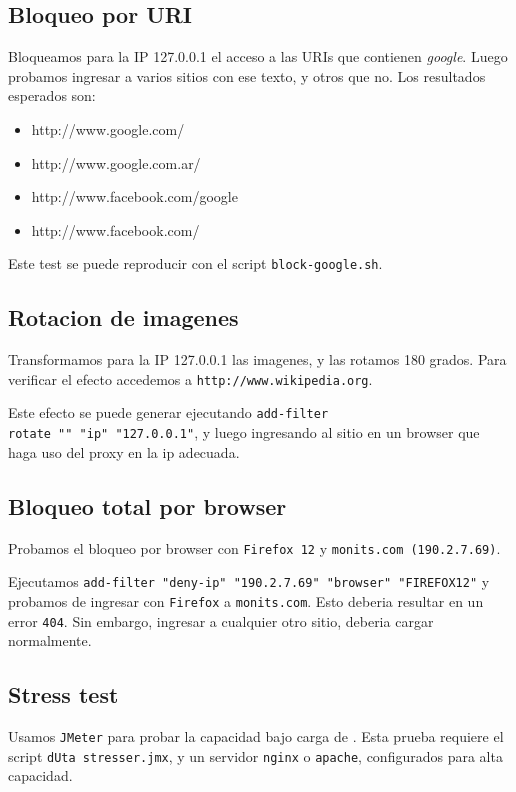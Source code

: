 \documentclass[11pt,a4paper,titlepage]{article}
\begin{document}
    \subsection{Bloqueo por URI}
    Bloqueamos para la IP 127.0.0.1 el acceso a las URIs que contienen \textit{google}.
    Luego probamos ingresar a varios sitios con ese texto, y otros que no.
    Los resultados esperados son:

    \begin{itemize}
        \item http://www.google.com/
        \item http://www.google.com.ar/
        \item http://www.facebook.com/google
        \item http://www.facebook.com/
    \end{itemize}

    Este test se puede reproducir con el script \texttt{block-google.sh}.

    \subsection{Rotacion de imagenes}
    Transformamos para la IP 127.0.0.1 las imagenes, y las rotamos 180 grados.
    Para verificar el efecto accedemos a \texttt{http://www.wikipedia.org}.

    Este efecto se puede generar ejecutando \texttt{add-filter rotate\ ""\ "ip"\ "127.0.0.1"}, y luego ingresando al sitio en un browser que haga uso del proxy en la ip adecuada.

    \subsection{Bloqueo total por browser}
    Probamos el bloqueo por browser con \texttt{Firefox 12} y \texttt{monits.com (190.2.7.69)}.

    Ejecutamos \texttt{add-filter\ "deny-ip"\ "190.2.7.69"\ "browser"\ "FIREFOX12"} y probamos de ingresar con \texttt{Firefox} a \texttt{monits.com}.
    Esto deberia resultar en un error \texttt{404}.
    Sin embargo, ingresar a cualquier otro sitio, deberia cargar normalmente.

    \subsection{Stress test}
    Usamos \texttt{JMeter} para probar la capacidad bajo carga de \duta.
    Esta prueba requiere el script \texttt{dUta stresser.jmx}, y un servidor \texttt{nginx} o \texttt{apache}, configurados para alta capacidad.
\end{document}
